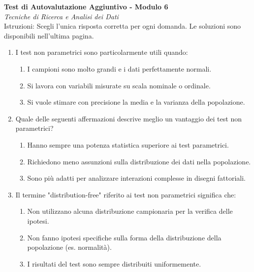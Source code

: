\documentclass[12pt, a4paper]{article}
\begin{document}
\begin{center}
    \Large\textbf{Test di Autovalutazione Aggiuntivo - Modulo 6} \\
    \vspace{0.2cm}
    \large\textit{Tecniche di Ricerca e Analisi dei Dati} \\
    \vspace{0.5cm}
    \normalsize{Istruzioni: Scegli l'unica risposta corretta per ogni domanda. Le soluzioni sono disponibili nell'ultima pagina.}
\end{center}
\vspace{1cm}

\begin{enumerate} %
    \item I test non parametrici sono particolarmente utili quando:
    \begin{enumerate} %
        \item I campioni sono molto grandi e i dati perfettamente normali.
        \item Si lavora con variabili misurate su scala nominale o ordinale.
        \item Si vuole stimare con precisione la media e la varianza della popolazione.
    \end{enumerate}
    \vspace{0.5cm}

    \item Quale delle seguenti affermazioni descrive meglio un vantaggio dei test non parametrici?
    \begin{enumerate}
        \item Hanno sempre una potenza statistica superiore ai test parametrici.
        \item Richiedono meno assunzioni sulla distribuzione dei dati nella popolazione.
        \item Sono più adatti per analizzare interazioni complesse in disegni fattoriali.
    \end{enumerate}
    \vspace{0.5cm}

    \item Il termine "distribution-free" riferito ai test non parametrici significa che:
    \begin{enumerate}
        \item Non utilizzano alcuna distribuzione campionaria per la verifica delle ipotesi.
        \item Non fanno ipotesi specifiche sulla forma della distribuzione della popolazione (es. normalità).
        \item I risultati del test sono sempre distribuiti uniformemente.
    \end{enumerate}
    \vspace{0.5cm}


\end{enumerate}
\end{document}
